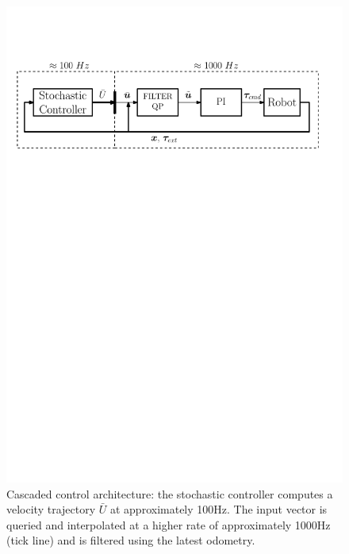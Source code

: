 \begin{figure}[t!]
\centering
\hspace*{-0.7cm}
\includegraphics[width=1.1\columnwidth]{figures/schemes/high_level_architecture.pdf}
\caption{Cascaded control architecture: the stochastic controller computes a velocity trajectory $\bar{U}$ at approximately 100Hz. The input vector is queried and interpolated at a higher rate of approximately 1000Hz (tick line) and is filtered using the latest odometry.} \label{fig:cascaded_architecture}
\end{figure}


